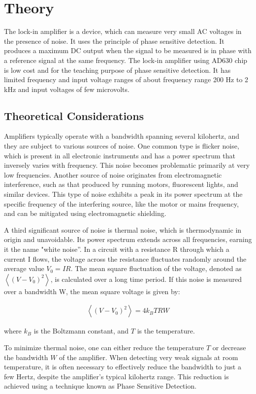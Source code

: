 \section{Theory}
The lock-in amplifier is a device, which can measure very small AC voltages in the
presence of noise. It uses the principle of phase sensitive detection. It produces a maximum DC output
when the signal to be measured is in phase with a
reference signal at the same frequency. The lock-in
amplifier using AD630 chip is low cost and for the
teaching purpose of phase sensitive detection. It has
limited frequency and input voltage ranges of about
frequency range 200 Hz to 2 kHz and input voltages
of few microvolts.

\subsection*{Theoretical Considerations}
Amplifiers typically operate with a bandwidth spanning several kilohertz, and they are subject to various sources of noise. One common type is flicker
noise, which is present in all electronic instruments
and has a power spectrum that inversely varies with
frequency. This noise becomes problematic primarily at very low frequencies. Another source of noise
originates from electromagnetic interference, such as
that produced by running motors, fluorescent lights,
and similar devices. This type of noise exhibits a
peak in its power spectrum at the specific frequency
of the interfering source, like the motor or mains frequency, and can be mitigated using electromagnetic
shielding.

A third significant source of noise is thermal noise,
which is thermodynamic in origin and unavoidable.
Its power spectrum extends across all frequencies,
earning it the name "white noise”. In a circuit with
a resistance R through which a current I flows,
the voltage across the resistance fluctuates randomly
around the average value $V_0 = IR$. The mean square
fluctuation of the voltage, denoted as $\left\langle(V - V_0)^2\right\rangle$,
is calculated over a long time period. If this noise
is measured over a bandwidth W, the mean square
voltage is given by:

\begin{align}
    \left\langle(V - V_0)^2\right\rangle = 4k_BTRW
\end{align}

where $k_B$ is the Boltzmann constant, and $T$ is the
temperature.

To minimize thermal noise, one can either reduce
the temperature $T$ or decrease the bandwidth $W$ of
the amplifier. When detecting very weak signals at
room temperature, it is often necessary to effectively
reduce the bandwidth to just a few Hertz, despite the
amplifier’s typical kilohertz range. This reduction is
achieved using a technique known as Phase Sensitive Detection.

